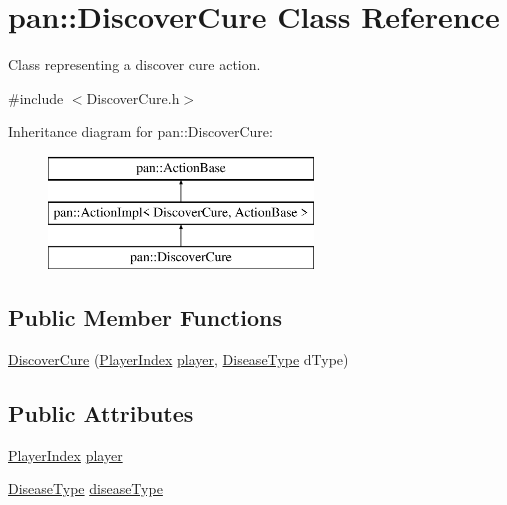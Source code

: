 \hypertarget{classpan_1_1_discover_cure}{}\section{pan\+:\+:Discover\+Cure Class Reference}
\label{classpan_1_1_discover_cure}


Class representing a discover cure action.  




{\ttfamily \#include $<$Discover\+Cure.\+h$>$}

Inheritance diagram for pan\+:\+:Discover\+Cure\+:\begin{figure}[H]
\begin{center}
\leavevmode
\includegraphics[height=3.000000cm]{classpan_1_1_discover_cure}
\end{center}
\end{figure}
\subsection*{Public Member Functions}
\begin{DoxyCompactItemize}
\item 
\hyperlink{classpan_1_1_discover_cure_a8619beb1af3c6dff42028831762b9dbe}{Discover\+Cure} (\hyperlink{namespacepan_a0cdabf874fbf1bb3a1f0152d108c2909}{Player\+Index} \hyperlink{classpan_1_1_discover_cure_a32a25e9bc1bb54c98d9a96c47c991ed7}{player}, \hyperlink{namespacepan_a48851b51b0aef3f0e1be80df5031d9d7}{Disease\+Type} d\+Type)
\end{DoxyCompactItemize}
\subsection*{Public Attributes}
\begin{DoxyCompactItemize}
\item 
\hyperlink{namespacepan_a0cdabf874fbf1bb3a1f0152d108c2909}{Player\+Index} \hyperlink{classpan_1_1_discover_cure_a32a25e9bc1bb54c98d9a96c47c991ed7}{player}
\item 
\hyperlink{namespacepan_a48851b51b0aef3f0e1be80df5031d9d7}{Disease\+Type} \hyperlink{classpan_1_1_discover_cure_ac5add4642696af23f73e024dfe1ec520}{disease\+Type}
\end{DoxyCompactItemize}


